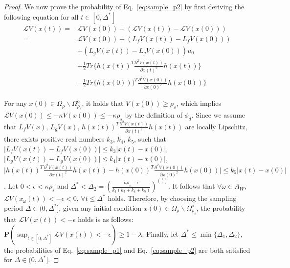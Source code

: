 \documentclass[letterpaper, 10pt, conference]{ieeeconf}
\begin{document}
\begin{proof}
We now prove the probability of Eq.~\ref{eq:sample_p2} by first deriving the following equation for all $t \in [0, \Delta^*]$
\begin{equation}
\begin{aligned}
\mathcal{L}V(x(t)) = &\mathcal{L}V(x(0))+(\mathcal{L}V(x(t))- \mathcal{L}V(x(0)))\\
 = &\mathcal{L}V(x(0))+(L_fV(x(t))-L_fV(x(0)))\\
&+(L_gV(x(t))-L_gV(x(0)))u_0 \\
&+ \frac{1}{2}Tr\{h(x(t))^T \frac{\partial^2V(x(t))}{\partial x(t)^2}h(x(t))\}\\
&- \frac{1}{2}Tr\{h(x(0)))^T \frac{\partial^2V(x(0))}{\partial x(0)^2}h(x(0))\}
\end{aligned}
\end{equation}

For any $x(0) \in \Omega_{\rho} \backslash \Omega_{\rho_s}^{\text{o}}$, it holds that $V(x(0)) \geq \rho_s$, which implies $\mathcal{L}V(x(0)) \leq - \kappa V(x(0)) \leq -\kappa\rho_s$ by the definition of $\phi_d$. Since we assume that $L_fV(x)$, $L_gV(x)$, $h(x(t))^T \frac{\partial^2V(x(t))}{\partial x(t)^2}h(x(t))$ are locally Lipschitz, there exists positive real numbers $k_3$, $k_4$, $k_5$, such that $\vert L_fV(x(t))-L_fV(x(0)) \vert \leq k_3 \vert x(t)- x(0) \vert$, $\vert L_gV(x(t))-L_gV(x(0)) \vert \leq k_4 \vert x(t)- x(0) \vert$, $\vert h(x(t))^T \frac{\partial^2V(x(t))}{\partial x(t)^2}h(x(t))-h(x(0))^T \frac{\partial^2V(x(0))}{\partial x(0)^2}h(x(0)) \vert \leq k_5 \vert x(t)- x(0) \vert$. Let $0 < \epsilon < \kappa\rho_s$ and $\Delta^* < \Delta_2 = (\frac{\kappa\rho_s-\epsilon}{k_1(k_3+k_4+k_5)})^{(\frac{1}{r})}$. It follows that $\forall \omega \in A_W$, $\mathcal{L}V(x_\omega(t)) < -\epsilon <0$, %
$\forall t \leq \Delta^*$ holds. Therefore, by choosing the sampling period $\Delta \in (0,\Delta^*]$, given any initial condition $x(0) \in \Omega_{\rho} \backslash \Omega_{\rho_s}^{\text{o}}$, the probability that $\mathcal{L}V(x(t)) <-\epsilon$ holds is as follows:
$\mathbf{P}(\sup_{t \in [0,\Delta^*]}
\mathcal{L}V(x(t)) <- \epsilon) \geq 1- \lambda$.
Finally, let $\Delta^*\leq \min \{ \Delta_1, \Delta_2\}$, the probabilities of Eq.~\ref{eq:sample_p1} and Eq.~\ref{eq:sample_p2} are both satisfied for $\Delta \in (0, \Delta^*]$.
\end{proof}
\end{document}
